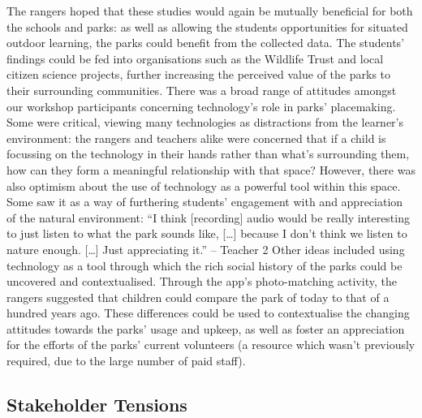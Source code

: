 The rangers hoped that these studies would again be mutually beneficial for both the schools and parks: as well as allowing the students opportunities for situated outdoor learning, the parks could benefit from the collected data. The students’ findings could be fed into organisations such as the Wildlife Trust and local citizen science projects, further increasing the perceived value of the parks to their surrounding communities.
There was a broad range of attitudes amongst our workshop participants concerning technology’s role in parks’ placemaking. Some were critical, viewing many technologies as distractions from the learner’s environment: the rangers and teachers alike were concerned that if a child is focussing on the technology in their hands rather than what’s surrounding them, how can they form a meaningful relationship with that space? However, there was also optimism about the use of technology as a powerful tool within this space. Some saw it as a way of furthering students’ engagement with and appreciation of the natural environment:
“I think [recording] audio would be really interesting to just listen to what the park sounds like, […] because I don’t think we listen to nature enough. […] Just appreciating it.” – Teacher 2
Other ideas included using technology as a tool through which the rich social history of the parks could be uncovered and contextualised. Through the app’s photo-matching activity, the rangers suggested that children could compare the park of today to that of a hundred years ago. These differences could be used to contextualise the changing attitudes towards the parks’ usage and upkeep, as well as foster an appreciation for the efforts of the parks’ current volunteers (a resource which wasn’t previously required, due to the large number of paid staff).

\subsection{Stakeholder Tensions}

